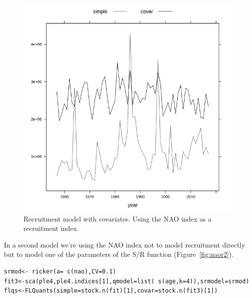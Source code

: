 \documentclass[a4paper,english,10pt]{article}\usepackage[]{graphicx}\usepackage[]{color}
\makeatletter
\newcommand{\hlnum}[1]{\textcolor[rgb]{0.063,0.58,0.627}{#1}}%
\newcommand{\hlopt}[1]{\textcolor[rgb]{0.196,0.196,0.196}{#1}}%
\newcommand{\hlstd}[1]{\textcolor[rgb]{0.196,0.196,0.196}{#1}}%
\newcommand{\hlkwb}[1]{\textcolor[rgb]{0.627,0,0.314}{#1}}%
\newcommand{\hlkwc}[1]{\textcolor[rgb]{0,0.631,0.314}{#1}}%
\newcommand{\hlkwd}[1]{\textcolor[rgb]{0.78,0.227,0.412}{#1}}%
\newenvironment{kframe}{%
 \def\at@end@of@kframe{}%
 \ifinner\ifhmode%
  \def\at@end@of@kframe{\end{minipage}}%
  \begin{minipage}{\columnwidth}%
 \fi\fi%
 \def\FrameCommand##1{\hskip\@totalleftmargin \hskip-\fboxsep
 \colorbox{shadecolor}{##1}\hskip-\fboxsep
     \hskip-\linewidth \hskip-\@totalleftmargin \hskip\columnwidth}%
 \MakeFramed {\advance\hsize-\width
   \@totalleftmargin\z@ \linewidth\hsize
   \@setminipage}}%
 {\par\unskip\endMakeFramed%
 \at@end@of@kframe}
\newenvironment{knitrout}{}{} %
\makeatother
\begin{document}
\begin{knitrout}
\color{fgcolor}\begin{figure}[H]

{\centering \includegraphics[width=.9\linewidth]{figure/naor-1} 

}

\caption[Recruitment model with covariates]{Recruitment model with covariates. Using the NAO index as a recruitment index.}\label{fig:naor}
\end{figure}


\end{knitrout}

In a second model we're using the NAO index not to model recruitment directly but to model one of the parameters of the S/R function (Figure~\ref{fig:naor2}).

\begin{knitrout}
\color{fgcolor}\begin{kframe}
\begin{alltt}
\hlstd{srmod} \hlkwb{<-} \hlopt{~}\hlkwd{ricker}\hlstd{(}\hlkwc{a} \hlstd{=} \hlopt{~}\hlkwd{c}\hlstd{(nao),} \hlkwc{CV} \hlstd{=} \hlnum{0.1}\hlstd{)}
\hlstd{fit3} \hlkwb{<-} \hlkwd{sca}\hlstd{(ple4, ple4.indices[}\hlnum{1}\hlstd{],} \hlkwc{qmodel} \hlstd{=} \hlkwd{list}\hlstd{(}\hlopt{~}\hlkwd{s}\hlstd{(age,} \hlkwc{k} \hlstd{=} \hlnum{4}\hlstd{)),} \hlkwc{srmodel} \hlstd{= srmod)}
\hlstd{flqs} \hlkwb{<-} \hlkwd{FLQuants}\hlstd{(}\hlkwc{simple} \hlstd{=} \hlkwd{stock.n}\hlstd{(fit)[}\hlnum{1}\hlstd{],} \hlkwc{covar} \hlstd{=} \hlkwd{stock.n}\hlstd{(fit3)[}\hlnum{1}\hlstd{])}
\end{alltt}
\end{kframe}
\end{knitrout}
\end{document}
